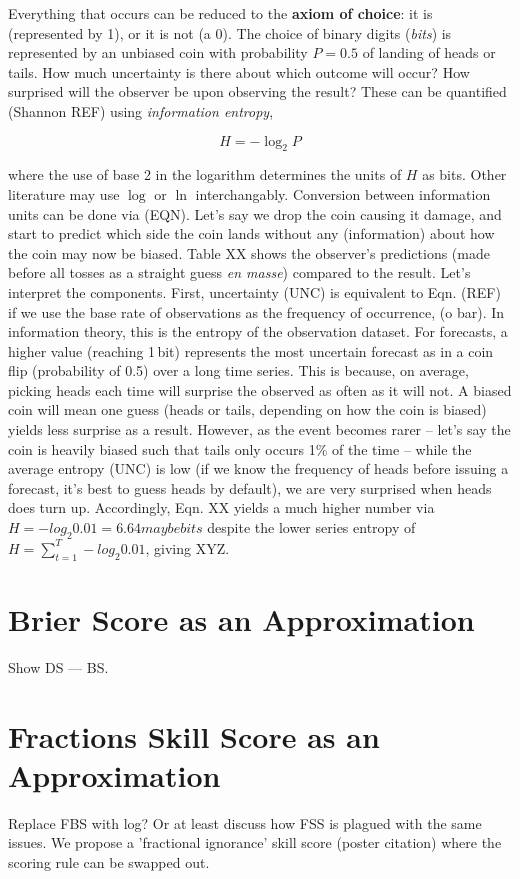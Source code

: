 \documentclass[draft]{ametsoc}
\begin{document}
Everything that occurs can be reduced to the \textbf{axiom of choice}: it is (represented by 1), or it is not (a 0). The choice of binary digits (\emph{bits}) is represented by an unbiased coin with probability $P = 0.5$ of landing of heads or tails. How much uncertainty is there about which outcome will occur? How surprised will the observer be upon observing the result? These can be quantified (Shannon REF) using \emph{information entropy},

\begin{equation}
    H = -\log_2 P
\end{equation}

where the use of base 2 in the logarithm determines the units of $H$ as bits. Other literature may use $\log$ or $\ln$ interchangably. Conversion between information units can be done via (EQN). Let's say we drop the coin causing it damage, and start to predict which side the coin lands without any (information) about how the coin may now be biased. Table XX shows the observer's predictions (made before all tosses as a straight guess \emph{en masse}) compared to the result. Let's interpret the components. First, uncertainty (UNC) is equivalent to Eqn. (REF) if we use the base rate of observations as the frequency of occurrence, (o bar). In information theory, this is the entropy of the observation dataset. For forecasts, a higher value (reaching 1\,bit) represents the most uncertain forecast as in a coin flip (probability of 0.5) over a long time series. This is because, on average, picking heads each time will surprise the observed as often as it will not. A biased coin will mean one guess (heads or tails, depending on how the coin is biased) yields less surprise as a result. However, as the event becomes rarer -- let's say the coin is heavily biased such that tails only occurs 1\% of the time -- while the average entropy (UNC) is low (if we know the frequency of heads before issuing a forecast, it's best to guess heads by default), we are very surprised when heads does turn up. Accordingly, Eqn. XX yields a much higher number via $H = -log_2 0.01 = 6.64 maybe bits$ despite the lower series entropy of $H = \sum^T_{t=1} -log_2 0.01$, giving XYZ.

\section{Brier Score as an Approximation}
Show DS --- BS.

\section{Fractions Skill Score as an Approximation}
Replace FBS with log? Or at least discuss how FSS is plagued with the same issues. We propose a 'fractional ignorance' skill score (poster citation) where the scoring rule can be swapped out.
\end{document}
